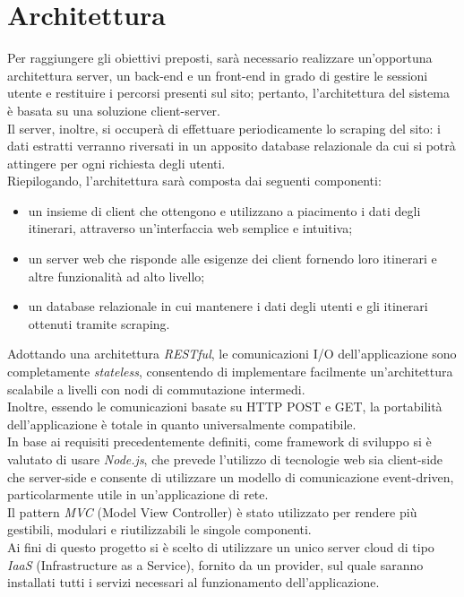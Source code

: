 \documentclass[11pt]{report}
\begin{document}
\section{Architettura}
Per raggiungere gli obiettivi preposti, sarà necessario realizzare un'opportuna architettura server, un back-end e un front-end in grado di gestire le sessioni utente e restituire i percorsi presenti sul sito; pertanto, l'architettura del sistema è basata su una soluzione client-server.
\\Il server, inoltre, si occuperà di effettuare periodicamente lo scraping del sito: i dati estratti verranno riversati in un apposito database relazionale da cui si potrà attingere per ogni richiesta degli utenti.
\\Riepilogando, l'architettura sarà composta dai seguenti componenti:
\begin{itemize}
	\item un insieme di client che ottengono e utilizzano a piacimento i dati degli itinerari, attraverso un'interfaccia web semplice e intuitiva;
	\item un server web che risponde alle esigenze dei client fornendo loro itinerari e altre funzionalità ad alto livello;
	\item un database relazionale in cui mantenere i dati degli utenti e gli itinerari ottenuti tramite scraping.
\end{itemize}
Adottando una architettura \textit{RESTful}, le comunicazioni I/O dell'applicazione sono completamente \textit{stateless}, consentendo di implementare facilmente un'architettura scalabile a livelli con nodi di commutazione intermedi.
\\Inoltre, essendo le comunicazioni basate su HTTP POST e GET, la portabilità dell'applicazione è totale in quanto universalmente compatibile.
\\In base ai requisiti precedentemente definiti, come framework di sviluppo si è valutato di usare \textit{Node.js}, che prevede l'utilizzo di tecnologie web sia client-side che server-side e consente di utilizzare un modello di comunicazione event-driven, particolarmente utile in un'applicazione di rete.
\\Il pattern \textit{MVC} (Model View Controller) è stato utilizzato per rendere più gestibili, modulari e riutilizzabili le singole componenti.
\\Ai fini di questo progetto si è scelto di utilizzare un unico server cloud di tipo \textit{IaaS} (Infrastructure as a Service), fornito da un provider, sul quale saranno installati tutti i servizi necessari al funzionamento dell'applicazione.
\end{document}
